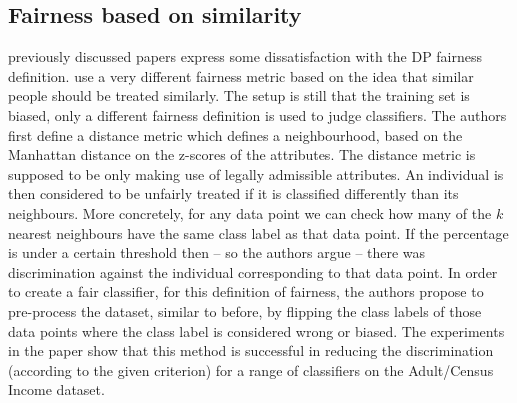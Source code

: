 
\subsection{Fairness based on similarity}%
previously discussed papers express some dissatisfaction with the \acf{DP} fairness definition.
\citet{luong2011k} use a very different fairness metric based on the idea that similar people
should be treated similarly. The setup is still that the training set is biased, only a different
fairness definition is used to judge classifiers. The authors first define a distance metric which
defines a neighbourhood, based on the Manhattan distance on the z-scores of the attributes. The
distance metric is supposed to be only making use of legally admissible attributes. An individual
is then considered to be unfairly treated if it is classified differently than its neighbours. More
concretely, for any data point we can check how many of the \(k\) nearest neighbours have the same
class label as that data point. If the percentage is under a certain threshold then -- so the
authors argue -- there was discrimination against the individual corresponding to that data point.
In order to create a fair classifier, for this definition of fairness, the authors propose to
pre-process the dataset, similar to \citet{kamiran2009classifying} before, by flipping the class
labels of those data points where the class label is considered wrong or biased. The experiments in
the paper show that this method is successful in reducing the discrimination (according to the
given criterion) for a range of classifiers on the Adult/Census Income dataset.

